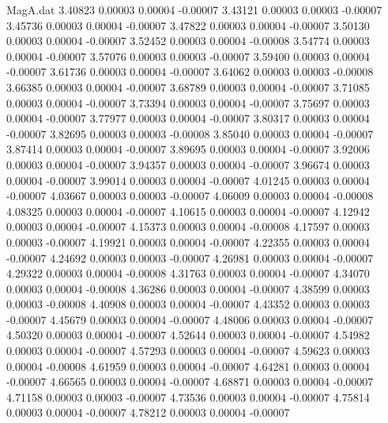 \begin{filecontents}{MagA.dat}
   3.40823    0.00003    0.00004   -0.00007
   3.43121    0.00003    0.00003   -0.00007
   3.45736    0.00003    0.00004   -0.00007
   3.47822    0.00003    0.00004   -0.00007
   3.50130    0.00003    0.00004   -0.00007
   3.52452    0.00003    0.00004   -0.00008
   3.54774    0.00003    0.00004   -0.00007
   3.57076    0.00003    0.00003   -0.00007
   3.59400    0.00003    0.00004   -0.00007
   3.61736    0.00003    0.00004   -0.00007
   3.64062    0.00003    0.00003   -0.00008
   3.66385    0.00003    0.00004   -0.00007
   3.68789    0.00003    0.00004   -0.00007
   3.71085    0.00003    0.00004   -0.00007
   3.73394    0.00003    0.00004   -0.00007
   3.75697    0.00003    0.00004   -0.00007
   3.77977    0.00003    0.00004   -0.00007
   3.80317    0.00003    0.00004   -0.00007
   3.82695    0.00003    0.00003   -0.00008
   3.85040    0.00003    0.00004   -0.00007
   3.87414    0.00003    0.00004   -0.00007
   3.89695    0.00003    0.00004   -0.00007
   3.92006    0.00003    0.00004   -0.00007
   3.94357    0.00003    0.00004   -0.00007
   3.96674    0.00003    0.00004   -0.00007
   3.99014    0.00003    0.00004   -0.00007
   4.01245    0.00003    0.00004   -0.00007
   4.03667    0.00003    0.00003   -0.00007
   4.06009    0.00003    0.00004   -0.00008
   4.08325    0.00003    0.00004   -0.00007
   4.10615    0.00003    0.00004   -0.00007
   4.12942    0.00003    0.00004   -0.00007
   4.15373    0.00003    0.00004   -0.00008
   4.17597    0.00003    0.00003   -0.00007
   4.19921    0.00003    0.00004   -0.00007
   4.22355    0.00003    0.00004   -0.00007
   4.24692    0.00003    0.00003   -0.00007
   4.26981    0.00003    0.00004   -0.00007
   4.29322    0.00003    0.00004   -0.00008
   4.31763    0.00003    0.00004   -0.00007
   4.34070    0.00003    0.00004   -0.00008
   4.36286    0.00003    0.00004   -0.00007
   4.38599    0.00003    0.00003   -0.00008
   4.40908    0.00003    0.00004   -0.00007
   4.43352    0.00003    0.00003   -0.00007
   4.45679    0.00003    0.00004   -0.00007
   4.48006    0.00003    0.00004   -0.00007
   4.50320    0.00003    0.00004   -0.00007
   4.52644    0.00003    0.00004   -0.00007
   4.54982    0.00003    0.00004   -0.00007
   4.57293    0.00003    0.00004   -0.00007
   4.59623    0.00003    0.00004   -0.00008
   4.61959    0.00003    0.00004   -0.00007
   4.64281    0.00003    0.00004   -0.00007
   4.66565    0.00003    0.00004   -0.00007
   4.68871    0.00003    0.00004   -0.00007
   4.71158    0.00003    0.00003   -0.00007
   4.73536    0.00003    0.00004   -0.00007
   4.75814    0.00003    0.00004   -0.00007
   4.78212    0.00003    0.00004   -0.00007

\end{filecontents}
